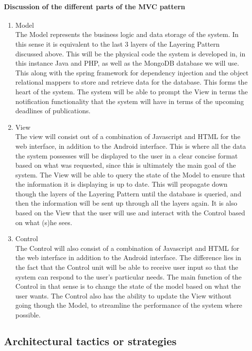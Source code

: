 \documentclass{article}
\begin{document}
\paragraph{Discussion of the different parts of the MVC pattern}
\begin{enumerate}
	\item Model \\
	The Model represents the business logic and data storage of the system. In this sense it is equivalent to the last 3 layers of the Layering Pattern discussed above. This will be the physical code the system is developed in, in this instance Java and PHP,  as well as the MongoDB database we will use. This along with the spring framework for dependency injection and the object relational mappers to store and retrieve data for the database. This forms the heart of the system. The system will be able to prompt the View in terms the notification functionality that the system will have in terms of the upcoming deadlines of publications. 
	\item View \\
	The view will consist out of a combination of Javascript and HTML for the web interface, in addition to the Android interface. This is where all the data the system possesses will be displayed to the user in a clear concise format based on what was requested, since this is ultimately the main goal of the system. The View will be able to query the state of the Model to ensure that the information it is displaying is up to date. This will propagate down though the layers of the Layering Pattern until the database is queried, and then the information will be sent up through all the layers again. It is also based on the View that the user will use and interact with the Control based on what (s)he sees.
	\item Control \\
	The Control will also consist of a combination of Javascript and HTML for the web interface in addition to the Android interface. The difference lies in the fact that the Control unit will be able to receive user input so that the system can respond to the user's particular needs. The main function of the Control in that sense is to change the state of the model based on what the user wants. The Control also has the ability to update the View without going though the Model, to streamline the performance of the system where possible.
\end{enumerate}

\subsection{Architectural tactics or strategies}
\end{document}
